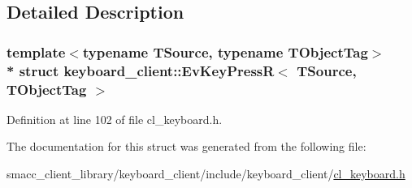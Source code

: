 \subsection{Detailed Description}
\subsubsection*{template$<$typename T\+Source, typename T\+Object\+Tag$>$\\*
struct keyboard\+\_\+client\+::\+Ev\+Key\+Press\+R$<$ T\+Source, T\+Object\+Tag $>$}



Definition at line 102 of file cl\+\_\+keyboard.\+h.



The documentation for this struct was generated from the following file\+:\begin{DoxyCompactItemize}
\item 
smacc\+\_\+client\+\_\+library/keyboard\+\_\+client/include/keyboard\+\_\+client/\hyperlink{cl__keyboard_8h}{cl\+\_\+keyboard.\+h}\end{DoxyCompactItemize}
